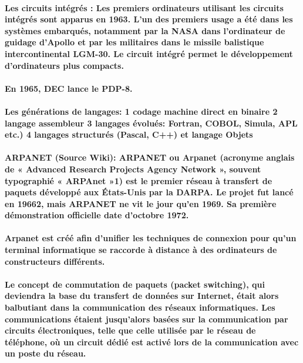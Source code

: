 \paragraph{
  Les circuits intégrés : Les premiers ordinateurs utilisant les circuits intégrés sont apparus en 1963. L'un des premiers usage a été dans les systèmes embarqués, notamment par la NASA dans l'ordinateur de guidage d'Apollo et par les militaires dans le missile balistique intercontinental LGM-30. Le circuit intégré permet le développement d'ordinateurs plus compacts.
}

\paragraph{
  En 1965, DEC lance le PDP-8.
}

\paragraph{
  Les générations de langages:
  1 codage machine direct en binaire
  2 langage assembleur
  3 langages évolués: Fortran, COBOL, Simula, APL etc.)
  4 langages structurés (Pascal, C++) et langage Objets
}

\paragraph{
  ARPANET (Source Wiki): ARPANET ou Arpanet (acronyme anglais de « Advanced Research Projects Agency Network », souvent typographié « ARPAnet »1) est le premier réseau à transfert de paquets développé aux États-Unis par la DARPA. Le projet fut lancé en 19662, mais ARPANET ne vit le jour qu'en 1969. Sa première démonstration officielle date d'octobre 1972.
}

\paragraph{
  Arpanet est créé afin d'unifier les techniques de connexion pour qu'un terminal informatique se raccorde à distance à des ordinateurs de constructeurs différents.
}

\paragraph{
  Le concept de commutation de paquets (packet switching), qui deviendra la base du transfert de données sur Internet, était alors balbutiant dans la communication des réseaux informatiques. Les communications étaient jusqu'alors basées sur la communication par circuits électroniques, telle que celle utilisée par le réseau de téléphone, où un circuit dédié est activé lors de la communication avec un poste du réseau.
}

